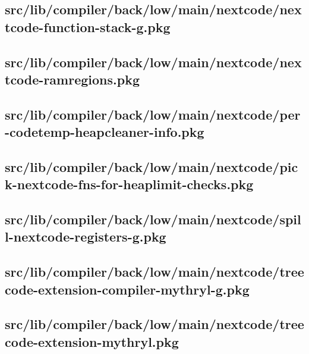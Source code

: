 \subsection{src/lib/compiler/back/low/main/nextcode/nextcode-function-stack-g.pkg}


\subsection{src/lib/compiler/back/low/main/nextcode/nextcode-ramregions.pkg}


\subsection{src/lib/compiler/back/low/main/nextcode/per-codetemp-heapcleaner-info.pkg}


\subsection{src/lib/compiler/back/low/main/nextcode/pick-nextcode-fns-for-heaplimit-checks.pkg}


\subsection{src/lib/compiler/back/low/main/nextcode/spill-nextcode-registers-g.pkg}


\subsection{src/lib/compiler/back/low/main/nextcode/treecode-extension-compiler-mythryl-g.pkg}


\subsection{src/lib/compiler/back/low/main/nextcode/treecode-extension-mythryl.pkg}


